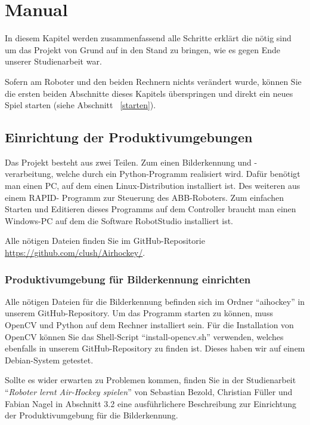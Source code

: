 
\chapter{Manual}
\label{manual}

In diesem Kapitel werden zusammenfassend alle Schritte erklärt die nötig sind um das Projekt von Grund auf in den Stand zu bringen, wie es gegen Ende unserer Studienarbeit war.

Sofern am Roboter und den beiden Rechnern nichts verändert wurde, können Sie die ersten beiden Abschnitte dieses Kapitels überspringen und direkt ein neues Spiel starten (siehe Abschnitt ~\ref{starten}). 

\section{Einrichtung der Produktivumgebungen}

Das Projekt besteht aus zwei Teilen. Zum einen Bilderkennung und -verarbeitung, welche durch ein Python-Programm realisiert wird. Dafür benötigt man einen PC, auf dem einen Linux-Distribution installiert ist. Des weiteren aus einem RAPID- Programm zur Steuerung des ABB-Roboters. Zum einfachen Starten und Editieren dieses Programms auf dem Controller braucht man einen Windows-PC auf dem die Software RobotStudio installiert ist. 

Alle nötigen Dateien finden Sie im GitHub-Repositorie \href{https://github.com/clush/Airhockey/}{https://github.com/clush/Airhockey/}.  

\subsection{Produktivumgebung für Bilderkennung einrichten}
Alle nötigen Dateien für die Bilderkennung befinden sich im Ordner \enquote{aihockey} in unserem GitHub-Repository. Um das Programm starten zu können, muss OpenCV und Python auf dem Rechner installiert sein. Für die Installation von OpenCV können Sie das Shell-Script \enquote{install-opencv.sh} verwenden, welches ebenfalls in unserem GitHub-Repository zu finden ist. Dieses haben wir auf einem Debian-System getestet. 

Sollte es wider erwarten zu Problemen kommen, finden Sie in der Studienarbeit \enquote{\textit{Roboter lernt Air-Hockey spielen}} von Sebastian Bezold, Christian Füller und Fabian Nagel in Abschnitt 3.2 eine ausführlichere Beschreibung zur Einrichtung der Produktivumgebung für die Bilderkennung.
\pagebreak

